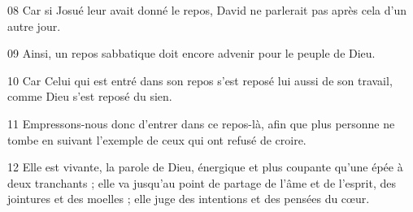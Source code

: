 
08 Car si Josué leur avait donné le repos, David ne parlerait pas après cela d’un autre jour.

09 Ainsi, un repos sabbatique doit encore advenir pour le peuple de Dieu.

10 Car Celui qui est entré dans son repos s’est reposé lui aussi de son travail, comme Dieu s’est reposé du sien.

11 Empressons-nous donc d’entrer dans ce repos-là, afin que plus personne ne tombe en suivant l’exemple de ceux qui ont refusé de croire.

12 Elle est vivante, la parole de Dieu, énergique et plus coupante qu’une épée à deux tranchants ; elle va jusqu’au point de partage de l’âme et de l’esprit, des jointures et des moelles ; elle juge des intentions et des pensées du cœur.